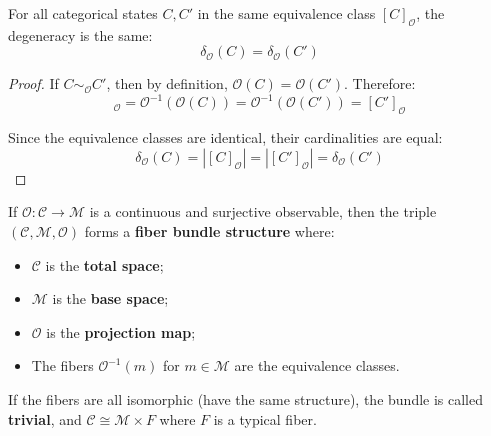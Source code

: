 \begin{proposition}
\label{prop:degeneracy_invariant_formal}
For all categorical states $C, C'$ in the same equivalence class $[C]_{\mathcal{O}}$, the degeneracy is the same:
\begin{equation}
\delta_{\mathcal{O}}(C) = \delta_{\mathcal{O}}(C')
\label{eq:degeneracy_invariance}
\end{equation}
\end{proposition}

\begin{proof}
If $C \sim_{\mathcal{O}} C'$, then by definition, $\mathcal{O}(C) = \mathcal{O}(C')$. Therefore:
\begin{equation}
[C]_{\mathcal{O}} = \mathcal{O}^{-1}(\mathcal{O}(C)) = \mathcal{O}^{-1}(\mathcal{O}(C')) = [C']_{\mathcal{O}}
\end{equation}

Since the equivalence classes are identical, their cardinalities are equal:
\begin{equation}
\delta_{\mathcal{O}}(C) = |[C]_{\mathcal{O}}| = |[C']_{\mathcal{O}}| = \delta_{\mathcal{O}}(C')
\end{equation}
\end{proof}

\begin{theorem}
\label{thm:fiber_bundle_formal}
If $\mathcal{O}: \mathcal{C} \to \mathcal{M}$ is a continuous and surjective observable, then the triple $(\mathcal{C}, \mathcal{M}, \mathcal{O})$ forms a \textbf{fiber bundle structure} where:
\begin{itemize}
    \item $\mathcal{C}$ is the \textbf{total space};
    \item $\mathcal{M}$ is the \textbf{base space};
    \item $\mathcal{O}$ is the \textbf{projection map};
    \item The fibers $\mathcal{O}^{-1}(m)$ for $m \in \mathcal{M}$ are the equivalence classes.
\end{itemize}

If the fibers are all isomorphic (have the same structure), the bundle is called \textbf{trivial}, and $\mathcal{C} \cong \mathcal{M} \times F$ where $F$ is a typical fiber.
\end{theorem}

